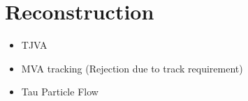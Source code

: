 \chapter{Reconstruction}
\label{sec:reconstruction}

\begin{itemize}
\item TJVA
\item MVA tracking (Rejection due to track requirement)
\item Tau Particle Flow
\end{itemize}
